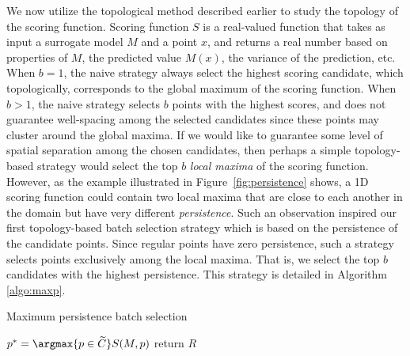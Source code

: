 We now utilize the topological method described earlier to study the topology of the scoring function.
%
Scoring function $S$ is a real-valued function that takes as input a surrogate model $M$ and a point $x$, and returns a real number based on properties of $M$, the predicted value $M(x)$, the variance of the prediction, etc.
%
When $b = 1$, the naive strategy always select the highest scoring candidate, which topologically, corresponds to the global maximum of the scoring function.
%
When $b > 1$, the naive strategy selects $b$ points with the highest scores, and does not guarantee well-spacing among the selected candidates since these points may cluster around the global maxima.
%
If we would like to guarantee some level of spatial separation among the chosen candidates, then perhaps a simple topology-based strategy would select the top $b$ \emph{local maxima} of the scoring function.
%
However, as the example illustrated in Figure~\ref{fig:persistence} shows, a 1D scoring function could contain two local maxima that are close to each another in the domain but have very different \emph{persistence}.
%
Such an observation inspired our first topology-based batch selection strategy which is based on the persistence of the candidate points.
%
Since regular points have zero persistence, such a strategy selects points exclusively among the local maxima.
%
That is, we select the top $b$ candidates with the highest persistence.
%
This strategy is detailed in Algorithm \ref{algo:maxp}.

{\fontsize{10}{10}\selectfont
\begin{algorithm}
\scriptsize
\caption{Maximum persistence batch selection}
\label{algo:maxp}
\begin{algorithmic}
  \State $p^* = \argmax{p \in \widetilde{C}} S(M, p)$
\EndWhile
{}
\State return $R$
\EndProcedure
\end{algorithmic}
\end{algorithm}
}

